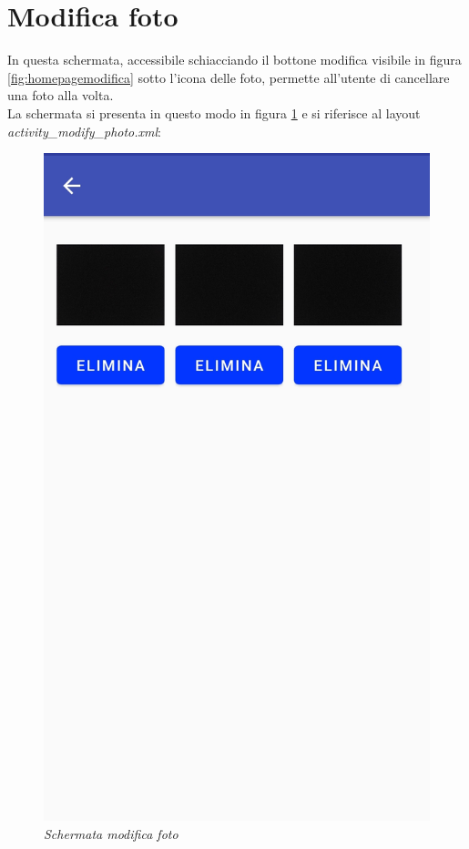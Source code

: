 \section{Modifica foto}
\label{modificafoto}
In questa schermata, accessibile schiacciando il bottone modifica visibile in figura \ref{fig:homepagemodifica} sotto l'icona delle foto, permette all'utente di cancellare una foto alla volta.
\\La schermata si presenta in questo modo in figura \ref{fig:modificafoto} e si riferisce al layout \textit{activity\_modify\_photo.xml}:
\begin{figure}[!h]
    \centering
	\includegraphics[scale=0.14]{Tesi/images/ModificaFoto.jpg}
	\caption{\textit{Schermata modifica foto}}
	\label{fig:modificafoto}
\end{figure}
